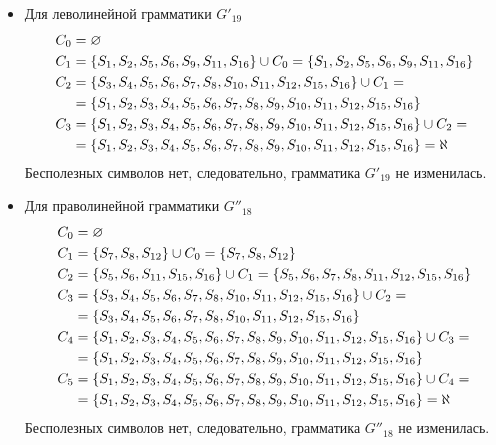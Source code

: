 \begin{itemize}
	\item Для леволинейной грамматики \(G'_{19}\)
	      \begin{align*}
		      C_0   & = \varnothing                                                                                            \\
		      C_{1} & = \left\{S_1, S_2, S_5, S_6, S_9, S_{11}, S_{16}\right\} \cup C_0 = \left\{S_1, S_2, S_5, S_6, S_9, S_{11}, S_{16}\right\} \\
		      C_{2} & = \left\{S_3, S_4, S_5, S_6, S_7, S_8, S_{10}, S_{11}, S_{12}, S_{15}, S_{16}\right\} \cup C_{1} =                \\
		            & = \left\{S_1, S_2, S_3, S_4, S_5, S_6, S_7, S_8, S_9, S_{10}, S_{11}, S_{12}, S_{15}, S_{16}\right\}              \\
		      C_{3} & = \left\{S_1, S_2, S_3, S_4, S_5, S_6, S_7, S_8, S_9, S_{10}, S_{11}, S_{12}, S_{15}, S_{16}\right\} \cup C_{2} = \\
		            & = \left\{S_1, S_2, S_3, S_4, S_5, S_6, S_7, S_8, S_9, S_{10}, S_{11}, S_{12}, S_{15}, S_{16}\right\} = \aleph
	      \end{align*}
	      Бесполезных символов нет, следовательно, грамматика \(G'_{19}\) не изменилась.
	\item Для праволинейной грамматики \(G''_{18}\)
	      \begin{align*}
		      C_0   & = \varnothing                                                                                                  \\
		      C_{1} & = \left\{S_7, S_8, S_{12}\right\} \cup C_0 = \left\{S_7, S_8, S_{12}\right\}                                                     \\
		      C_{2} & = \left\{S_5, S_6, S_{11}, S_{15}, S_{16}\right\} \cup C_{1} = \left\{S_5, S_6, S_7, S_8, S_{11}, S_{12}, S_{15}, S_{16}\right\} \\
		      C_{3} & = \left\{S_3, S_4, S_5, S_6, S_7, S_8, S_{10}, S_{11}, S_{12}, S_{15}, S_{16}\right\} \cup C_{2} =                      \\
		            & = \left\{S_3, S_4, S_5, S_6, S_7, S_8, S_{10}, S_{11}, S_{12}, S_{15}, S_{16}\right\}                                   \\
		      C_{4} & = \left\{S_1, S_2, S_3, S_4, S_5, S_6, S_7, S_8, S_9, S_{10}, S_{11}, S_{12}, S_{15}, S_{16}\right\} \cup C_{3} =       \\
		            & = \left\{S_1, S_2, S_3, S_4, S_5, S_6, S_7, S_8, S_9, S_{10}, S_{11}, S_{12}, S_{15}, S_{16}\right\}                    \\
		      C_{5} & = \left\{S_1, S_2, S_3, S_4, S_5, S_6, S_7, S_8, S_9, S_{10}, S_{11}, S_{12}, S_{15}, S_{16}\right\} \cup C_{4} =       \\
		            & = \left\{S_1, S_2, S_3, S_4, S_5, S_6, S_7, S_8, S_9, S_{10}, S_{11}, S_{12}, S_{15}, S_{16}\right\} = \aleph
	      \end{align*}
	      Бесполезных символов нет, следовательно, грамматика \(G''_{18}\) не изменилась.
\end{itemize}
